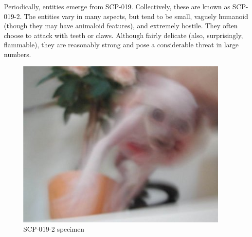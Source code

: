 Periodically, entities emerge from SCP-019. Collectively, these are known as SCP-019-2. The entities vary in many aspects, but tend to be small, vaguely humanoid (though they may have animaloid features), and extremely hostile. They often choose to attack with teeth or claws. Although fairly delicate (also, surprisingly, flammable), they are reasonably strong and pose a considerable threat in large numbers.

\begin{figure}[h]
\begin{center}
\includegraphics[scale=0.55]{scp/019b.jpg}
\linebreak SCP-019-2 specimen
\end{center}
\end{figure}

